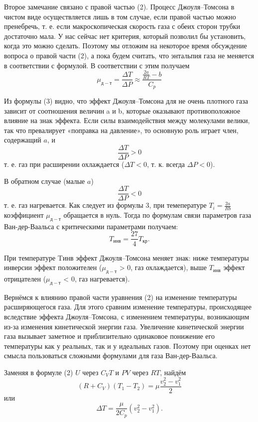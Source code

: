 \documentclass[12pt,a4paper]{article}
\begin{document}
Второе замечание связано с правой частью (2). 
Процесс Джоуля–Томсона в чистом виде осуществляется лишь в том случае, если правой частью можно пренебречь, т. е. если макроскопическая скорость газа с обеих сторон трубки достаточно мала. 
У нас сейчас нет критерия, который позволил бы установить, когда это можно сделать. 
Поэтому мы отложим на некоторое время обсуждение вопроса о правой части (2), а пока будем считать, что энтальпия газа не меняется в соответствии с формулой.
В соответствии с этим получаем
\begin{equation}
    \mu_{д-т} = \frac {\Delta T}{\Delta P} \approx \frac {\frac {2a}{RT} - b}{C_p}
\end{equation}

Из формулы (3) видно, что эффект Джоуля–Томсона для не очень плотного газа зависит от соотношения величин a и b, которые оказывают противоположное влияние на знак эффекта. 
Если силы взаимодействия между молекулами велики, так что превалирует «поправка на давление», то основную роль играет член, содержащий $a$, и $$\frac {\Delta T} {\Delta P} > 0$$
т. е. газ при расширении охлаждается ($\Delta T < 0$, т. к. всегда $\Delta P < 0$).

В обратном случае (малые $a$) $$\frac {\Delta T} {\Delta P} < 0$$ т. е. газ нагревается. 
Как следует из формулы 3, при темепературе $T_i = \frac{2a}{Rb}$ коэффициент $\mu_{д-т}$ обращается в нуль.
Тогда по формулам связи параметров газа Ван-дер-Ваальса с критическими параметрами получаем:
\begin{equation}
    T_{инв} = \frac{27}4 T_{кр}.
\end{equation} 

При температуре Tинв эффект Джоуля–Томсона меняет знак: ниже температуры инверсии эффект положителен ($\mu_{д-т}$ > 0, газ охлаждается), выше $T_{инв}$ эффект отрицателен ($\mu_{д-т}$ < 0, газ нагревается).

Вернёмся к влиянию правой части уравнения (2) на изменение температуры расширяющегося газа. 
Для этого сравним изменение температуры, происходящее вследствие эффекта Джоуля–Томсона, с изменением температуры, возникающим из-за изменения кинетической энергии газа. 
Увеличение кинетической энергии газа вызывает заметное и приблизительно одинаковое понижение его температуры как у реальных, так и у идеальных газов. 
Поэтому при оценках нет смысла пользоваться сложными формулами для газа Ван-дер-Ваальса.

Заменяя в формуле (2) $U$ через $C_V T$ и $P V$ через $R T$, найдём
\begin{equation*}
    (R + C_V)(T_1 - T_2) = \mu \frac{v_2^2 - v_1^2}2
\end{equation*}
или 
\begin{equation*}
    \Delta T = \frac{\mu}{2C_p} (v_2^2-v_1^2).
\end{equation*}
\end{document}
